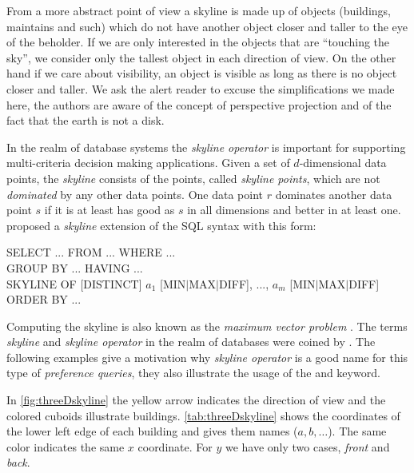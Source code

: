 From a more abstract point of view a skyline is made up of objects
(buildings, maintains and such) which do not have another object
closer and taller to the eye of the beholder. If we are only
interested in the objects that are ``touching the sky'', we consider
only the tallest object in each direction of view. On the other hand
if we care about visibility, an object is visible as long as there is
no object closer and taller. We ask the alert reader to excuse the
simplifications we made here, the authors are aware of the concept of
perspective projection and of the fact that the earth is not a disk.

\bigskip
In the realm of database systems the \emph{skyline operator} is
important for supporting multi-criteria decision making applications.
Given a set of $d$-dimensional data points, the \emph{skyline}
consists of the points, called \emph{skyline points}, which are not
{\em dominated} by any other data points. One data point $r$ dominates
another data point $s$ if it is at least has good as $s$ in all
dimensions and better in at least one.
\citet{Borzsonyi2001} proposed a {\em skyline} extension of the SQL
syntax with this form:

\begin{sql}
SELECT ... FROM ... WHERE ... \\
GROUP BY ... HAVING ...       \\
SKYLINE OF \textnormal{[}DISTINCT\textnormal{]} $a_1$ \textnormal{[}MIN$|$MAX$|$DIFF\textnormal{]}, ..., $a_m$ \textnormal{[}MIN$|$MAX$|$DIFF\textnormal{]} \\
ORDER BY ...
\end{sql}

Computing the skyline is also known as the \emph{maximum vector
problem} \citep{Kung1975, Preparata1985}. The terms \emph{skyline} and
\emph{skyline operator} in the realm of databases were coined by
\citet{Borzsonyi2001}. The following examples give a motivation why 
\emph{skyline operator} is a good name for this type of
\emph{preference queries}, they also illustrate the usage of the
 and  keyword.

In \autoref{fig:threeDskyline} the yellow arrow indicates the
direction of view and the colored cuboids illustrate
buildings. \autoref{tab:threeDskyline} shows the coordinates of the
lower left edge of each building and gives them names ($a, b,
\ldots$). The same color indicates the same $x$ coordinate. For $y$ we
have only two cases, \emph{front} and
\emph{back}.

